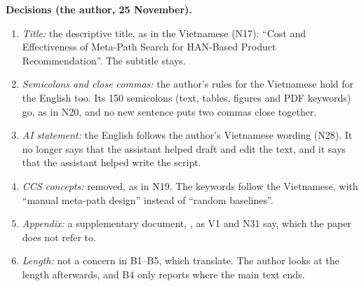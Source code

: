 \documentclass[11pt,a4paper]{article}
\DeclareRobustCommand{\code}[1]{\texttt{\detokenize{#1}}}
\begin{document}
\textbf{Decisions (the author, 25 November).}
\begin{enumerate}[label=D\arabic*]
  \item \emph{Title:} the descriptive title, as in the Vietnamese (N17): ``Cost and Effectiveness
        of Meta-Path Search for HAN-Based Product Recommendation''. The subtitle stays.
  \item \emph{Semicolons and close commas:} the author's rules for the Vietnamese hold for the
        English too. Its 150 semicolons (text, tables, figures and PDF keywords) go, as in N20, and
        no new sentence puts two commas close together.
  \item \emph{AI statement:} the English follows the author's Vietnamese wording (N28). It no
        longer says that the assistant helped draft and edit the text, and it says that the
        assistant helped write the script.
  \item \emph{CCS concepts:} removed, as in N19. The keywords follow the Vietnamese, with ``manual
        meta-path design'' instead of ``random baselines''.
  \item \emph{Appendix:} a supplementary document, \code{supplement_v2.tex}, as V1 and N31 say,
        which the paper does not refer to.
  \item \emph{Length:} not a concern in B1--B5, which translate. The author looks at the length
        afterwards, and B4 only reports where the main text ends.
\end{enumerate}
\end{document}
